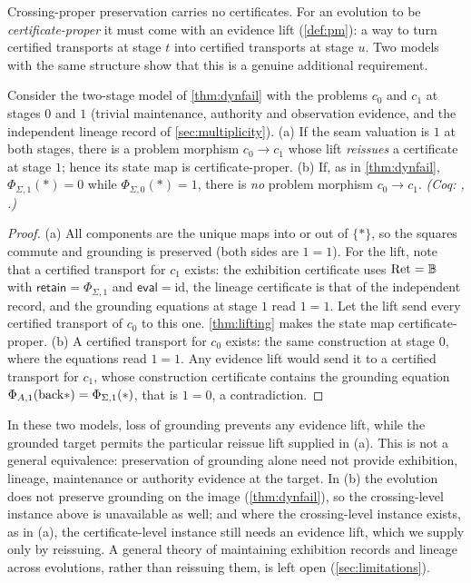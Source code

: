Crossing-proper preservation carries no certificates. For an evolution to be \emph{certificate-proper} it must come with an evidence lift (\cref{def:pm}): a way to turn certified transports at stage $t$ into certified transports at stage $u$. Two models with the same structure show that this is a genuine additional requirement.
\begin{thm}\label{thm:reissue}
Consider the two-stage model of \cref{thm:dynfail} with the problems $c_0$ and $c_1$ at stages $0$ and $1$ (trivial maintenance, authority and observation evidence, and the independent lineage record of \cref{sec:multiplicity}).
(a) If the seam valuation is $1$ at both stages, there is a problem morphism $c_0 \to c_1$ whose lift \emph{reissues} a certificate at stage $1$; hence its state map is certificate-proper.
(b) If, as in \cref{thm:dynfail}, $\Phi_{\Sigma,1}(\ast) = 0$ while $\Phi_{\Sigma,0}(\ast) = 1$, there is \emph{no} problem morphism $c_0 \to c_1$.
\emph{(Coq: , .)}
\end{thm}
\begin{proof}
(a) All components are the unique maps into or out of $\{\ast\}$, so the squares commute and grounding is preserved (both sides are $1 = 1$). For the lift, note that a certified transport for $c_1$ exists: the exhibition certificate uses $\mathrm{Ret} = \mathbb{B}$ with $\mathsf{retain} = \Phi_{\Sigma,1}$ and $\mathsf{eval} = \mathrm{id}$, the lineage certificate is that of the independent record, and the grounding equations at stage $1$ read $1 = 1$. Let the lift send every certified transport of $c_0$ to this one. \cref{thm:lifting} makes the state map certificate-proper.
(b) A certified transport for $c_0$ exists: the same construction at stage $0$, where the equations read $1 = 1$. Any evidence lift would send it to a certified transport for $c_1$, whose construction certificate contains the grounding equation $\Phi_{A,1}(\mathrm{back}\ast) = \Phi_{\Sigma,1}(\ast)$, that is $1 = 0$, a contradiction.
\end{proof}
In these two models, loss of grounding prevents any evidence lift, while the grounded target permits the particular reissue lift supplied in (a). This is not a general equivalence: preservation of grounding alone need not provide exhibition, lineage, maintenance or authority evidence at the target. In (b) the evolution does not preserve grounding on the image (\cref{thm:dynfail}), so the crossing-level instance above is unavailable as well; and where the crossing-level instance exists, as in (a), the certificate-level instance still needs an evidence lift, which we supply only by reissuing. A general theory of maintaining exhibition records and lineage across evolutions, rather than reissuing them, is left open (\cref{sec:limitations}).

